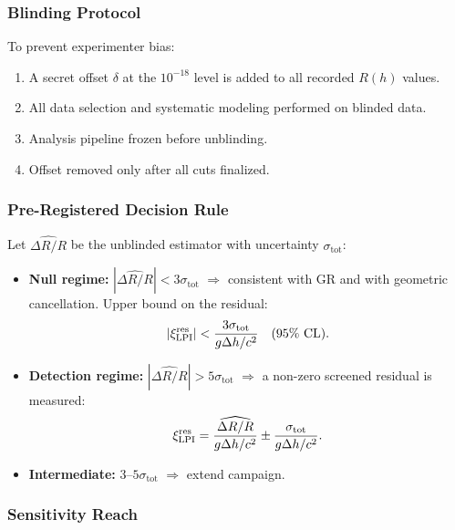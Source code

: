 \subsubsection{Blinding Protocol}

To prevent experimenter bias:
\begin{enumerate}
\item A secret offset $\delta$ at the $10^{-18}$ level is added to all 
recorded $R(h)$ values.
\item All data selection and systematic modeling performed on blinded data.
\item Analysis pipeline frozen before unblinding.
\item Offset removed only after all cuts finalized.
\end{enumerate}

\subsubsection{Pre-Registered Decision Rule}

Let $\widehat{\Delta R/R}$ be the unblinded estimator with uncertainty $\sigma_{\mathrm{tot}}$:

\begin{itemize}
\item \textbf{Null regime:} $|\widehat{\Delta R/R}| < 3\sigma_{\mathrm{tot}}$ 
$\Rightarrow$ consistent with GR and with geometric cancellation.  Upper bound on the residual:
\begin{equation}
|\xi_{\rm LPI}^{\rm res}| < \frac{3\sigma_{\mathrm{tot}}}{g\Delta h/c^2} \quad (95\%~\text{CL}).
\end{equation}

\item \textbf{Detection regime:} $|\widehat{\Delta R/R}| > 5\sigma_{\mathrm{tot}}$ 
$\Rightarrow$ a non-zero screened residual is measured:
\begin{equation}
\xi_{\rm LPI}^{\rm res} = \frac{\widehat{\Delta R/R}}{g\Delta h/c^2} \pm \frac{\sigma_{\mathrm{tot}}}{g\Delta h/c^2}.
\end{equation}

\item \textbf{Intermediate:} $3$--$5\sigma_{\mathrm{tot}}$ $\Rightarrow$ extend campaign.
\end{itemize}

\subsubsection{Sensitivity Reach}

